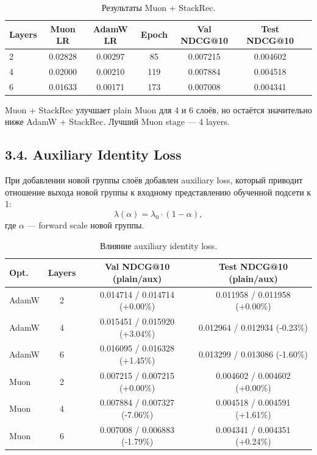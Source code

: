 \documentclass[11pt,a4paper]{article}
\begin{document}
\begin{table}[H]
\centering
\begin{tabular}{lcccccc}
\toprule
Layers & Muon LR & AdamW LR & Epoch & Val NDCG@10 & Test NDCG@10 \\
\midrule
2 & 0.02828 & 0.00297 & 85 & 0.007215 & 0.004602 \\
4 & 0.02000 & 0.00210 & 119 & 0.007884 & 0.004518 \\
6 & 0.01633 & 0.00171 & 173 & 0.007008 & 0.004341 \\
\bottomrule
\end{tabular}
\caption{Результаты Muon + StackRec.}
\end{table}

Muon + StackRec улучшает plain Muon для 4 и 6 слоёв, но остаётся
значительно ниже AdamW + StackRec. Лучший Muon stage — 4 layers.

\subsection*{3.4. Auxiliary Identity Loss}

При добавлении новой группы слоёв добавлен auxiliary loss, который
приводит отношение выхода новой группы к входному представлению
обученной подсети к 1:
\[
\lambda(\alpha) = \lambda_0 \cdot (1 - \alpha),
\]
где $\alpha$ — forward scale новой группы.

\begin{table}[H]
\centering
\small
\begin{tabular}{lccc}
\toprule
Opt. & Layers & Val NDCG@10 (plain/aux) & Test NDCG@10 (plain/aux) \\
\midrule
AdamW & 2 & 0.014714 / 0.014714 (+0.00\%) & 0.011958 / 0.011958 (+0.00\%) \\
AdamW & 4 & 0.015451 / 0.015920 (+3.04\%) & 0.012964 / 0.012934 (-0.23\%) \\
AdamW & 6 & 0.016095 / 0.016328 (+1.45\%) & 0.013299 / 0.013086 (-1.60\%) \\
Muon & 2 & 0.007215 / 0.007215 (+0.00\%) & 0.004602 / 0.004602 (+0.00\%) \\
Muon & 4 & 0.007884 / 0.007327 (-7.06\%) & 0.004518 / 0.004591 (+1.61\%) \\
Muon & 6 & 0.007008 / 0.006883 (-1.79\%) & 0.004341 / 0.004351 (+0.24\%) \\
\bottomrule
\end{tabular}
\caption{Влияние auxiliary identity loss.}
\end{table}
\end{document}
